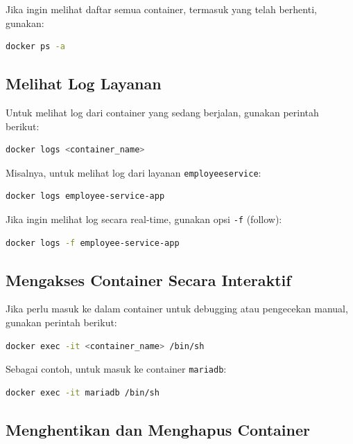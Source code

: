 Jika ingin melihat daftar semua container, termasuk yang telah berhenti, gunakan:

\begin{lstlisting}[language=bash]
	docker ps -a
\end{lstlisting}

\subsection{Melihat Log Layanan}

Untuk melihat log dari container yang sedang berjalan, gunakan perintah berikut:

\begin{lstlisting}[language=bash]
	docker logs <container_name>
\end{lstlisting}

Misalnya, untuk melihat log dari layanan \texttt{employeeservice}:

\begin{lstlisting}[language=bash]
	docker logs employee-service-app
\end{lstlisting}

Jika ingin melihat log secara real-time, gunakan opsi \texttt{-f} (follow):

\begin{lstlisting}[language=bash]
	docker logs -f employee-service-app
\end{lstlisting}

\subsection{Mengakses Container Secara Interaktif}

Jika perlu masuk ke dalam container untuk debugging atau pengecekan manual, gunakan perintah berikut:

\begin{lstlisting}[language=bash]
	docker exec -it <container_name> /bin/sh
\end{lstlisting}

Sebagai contoh, untuk masuk ke container \texttt{mariadb}:

\begin{lstlisting}[language=bash]
	docker exec -it mariadb /bin/sh
\end{lstlisting}

\subsection{Menghentikan dan Menghapus Container}

